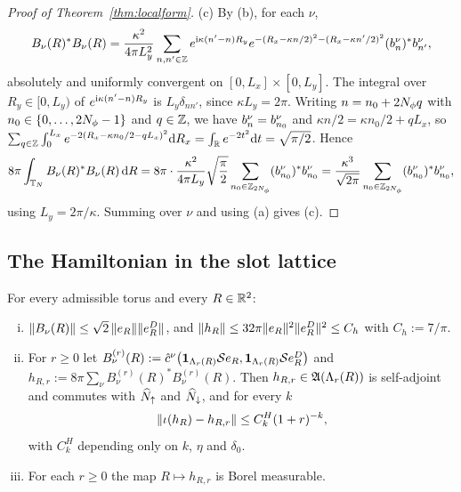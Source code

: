 \begin{proof}[Proof of Theorem~\ref{thm:localform}]
(c) By (b), for each $\nu$,
\[
B_\nu(R)^*B_\nu(R)=\frac{\kappa^2}{4\pi L_y^2}\sum_{n,n'\in\mathbb{Z}}e^{\mathrm{i}\kappa(n'-n)R_y}e^{-(R_x-\kappa n/2)^2-(R_x-\kappa n'/2)^2}
(b^{\nu}_{n})^*b^{\nu}_{n'},
\]
absolutely and uniformly convergent on $[0,L_x]\times[0,L_y]$. The integral over $R_y\in[0,L_y)$ of
$e^{\mathrm{i}\kappa(n'-n)R_y}$ is $L_y\delta_{nn'}$, since $\kappa L_y=2\pi$. Writing $n=n_0+2N_{\phi} q$ with
$n_0\in\{0,\dots,2N_{\phi}-1\}$ and $q\in\mathbb{Z}$, we have $b^{\nu}_{n}=b^{\nu}_{n_0}$ and $\kappa n/2=\kappa n_0/2+qL_x$, so
$\sum_{q\in\mathbb{Z}}\int_0^{L_x}e^{-2(R_x-\kappa n_0/2-qL_x)^2}\mathrm{d} R_x=\int_{\mathbb{R}} e^{-2t^2}\mathrm{d} t=\sqrt{\pi/2}$. Hence
\[
8\pi\int_{\mathbb{T}_N}B_\nu(R)^*B_\nu(R)\,\mathrm{d} R=8\pi\cdot\frac{\kappa^2}{4\pi L_y}\sqrt{\frac\pi2}\sum_{n_0\in\mathbb{Z}_{2N_{\phi}}}(b^{\nu}_{n_0})^*b^{\nu}_{n_0}
=\frac{\kappa^3}{\sqrt{2\pi}}\sum_{n_0\in\mathbb{Z}_{2N_{\phi}}}(b^{\nu}_{n_0})^*b^{\nu}_{n_0},
\]
using $L_y=2\pi/\kappa$. Summing over $\nu$ and using (a) gives (c).
\end{proof}

\subsection{The Hamiltonian in the slot lattice}

\begin{proposition}\label{prop:slotH}
For every admissible torus and every $R\in\mathbb{R}^2$:
\begin{enumerate}[(i)]
\item $\lVert B_\nu(R)\rVert\le\sqrt2\,\lVert e_{R}\rVert\lVert e^{D}_{R}\rVert$, and $\lVert h_R\rVert\le32\pi\lVert e_{R}\rVert^2\lVert e^{D}_{R}\rVert^2\le C_h$
with $C_h:=7/\pi$.
\item For $r\ge0$ let $B^{(r)}_\nu(R):=\hat{c}^{\nu}\bigl(\mathbf{1}_{\Lambda_{r}(R)}\mathcal{S}e_{R},\mathbf{1}_{\Lambda_{r}(R)}\mathcal{S}e^{D}_{R}\bigr)$ and
$h_{R,r}:=8\pi\sum_\nu B^{(r)}_\nu(R)^*B^{(r)}_\nu(R)$. Then $h_{R,r}\in\mathfrak{A}(\Lambda_{r}(R))$ is self-adjoint and commutes
with $\widehat{N}_{{\uparrow}}$ and $\widehat{N}_{{\downarrow}}$, and for every $k$
\[
\lVert\iota(h_R)-h_{R,r}\rVert\le C^H_k(1+r)^{-k},
\]
with $C^H_k$ depending only on $k$, $\eta$ and $\delta_0$.
\item For each $r\ge0$ the map $R\mapsto h_{R,r}$ is Borel measurable.
\end{enumerate}
\end{proposition}

